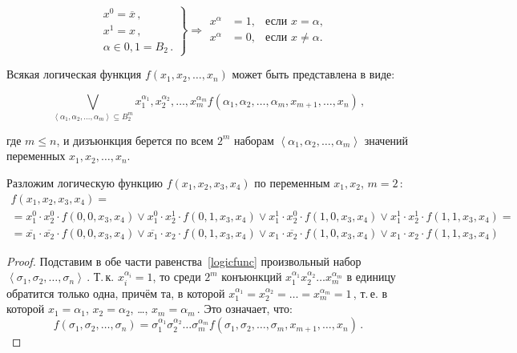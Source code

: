 $$
\left.
\begin{aligned} &x^0=\overline x\,,\\ &x^1=x\,,\\
&\alpha\in{0,1}=B_2\,.
\end{aligned} \right\} \Rightarrow
\begin{aligned} x^\alpha&=1,& \text{если $x=\alpha$,}\\ x^\alpha&=0,&
\text{если $x\ne\alpha$.}
\end{aligned}
$$

\begin{theorem} Всякая логическая
функция $f(x_1,x_2,\ldots,x_n)$ может быть представлена в виде:

  \begin{equation}
    \label{logicfunc} \bigvee_{\left<
\alpha_1,\alpha_2,\ldots,\alpha_m \right> \subseteq
B_2^m}x_1^{\alpha_1},x_2^{\alpha_2},\ldots,x_m^{\alpha_m}
f(\alpha_1,\alpha_2,\ldots,\alpha_m,x_{m+1},\ldots,x_n)\,,
  \end{equation}
  
  где $m\leqslant n$, и дизъюнкция берется по всем $2^m$ наборам
$\left< \alpha_1,\alpha_2,\ldots,\alpha_m \right>$ значений переменных
$x_1,x_2,\ldots,x_n$.
\end{theorem}

\begin{ex} Разложим логическую функцию $f(x_1,x_2,x_3,x_4)$ по
переменным $x_1,x_2$, \linebreak[4] $m=2$\,:
  \begin{multline*} f(x_1,x_2,x_3,x_4) = \\ =
x_1^0\cdot{}x_2^0\cdot{}f(0,0,x_3,x_4) \lor
x_1^0\cdot{}x_2^1\cdot{}f(0,1,x_3,x_4) \lor
x_1^1\cdot{}x_2^0\cdot{}f(1,0,x_3,x_4) \lor
x_1^1\cdot{}x_2^1\cdot{}f(1,1,x_3,x_4) = \\ =
\overline{x_1}\cdot{}\overline{x_2}\cdot{}f(0,0,x_3,x_4) \lor
\overline{x_1}\cdot{}x_2\cdot{}f(0,1,x_3,x_4) \lor
x_1\cdot{}\overline{x_2}\cdot{}f(1,0,x_3,x_4) \lor
x_1\cdot{}x_2\cdot{}f(1,1,x_3,x_4)
  \end{multline*}
\end{ex}

\begin{proof} Подставим в обе части равенства~\eqref{logicfunc}
произвольный набор \linebreak $\left<
\sigma_1,\sigma_2,\ldots,\sigma_n
\right>$\,. Т.\,к. $x_i^{\alpha_i}=1$, то среди $2^m$ конъюнкций
$x_1^{\alpha_1}x_2^{\alpha_2}\ldots{}x_m^{\alpha_m}$ в единицу
обратится только одна, причём та, в которой
$x_1^{\alpha_1}=x_2^{\alpha_2}=\ldots=x_m^{\alpha_m}=1$\,, т.\,е. в
которой $x_1=\alpha_1$, $x_2=\alpha_2$, \ldots, $x_m=\alpha_m$\,. Это
означает, что:
  $$
  f(\sigma_1, \sigma_2, \ldots, \sigma_n) = \sigma_1^{\alpha_1}
\sigma_2^{\alpha_2} \ldots \sigma_m^{\alpha_m} f(\sigma_1, \sigma_2,
\ldots, \sigma_m, x_{m+1}, \ldots, x_n) \,.
  $$
\end{proof}

